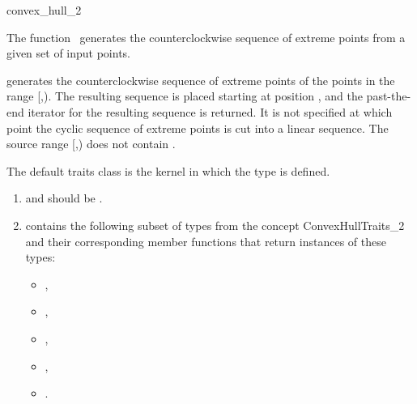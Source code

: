 

\begin{ccRefFunction}{convex_hull_2}  %

\ccDefinition
  
The function \ccRefName\ generates the counterclockwise sequence of extreme
points from a given set of input points.  


            {generates the counterclockwise sequence of extreme points
            of the points in the range [,).
            The resulting sequence is placed starting at position
            , and the past-the-end iterator for the resulting
            sequence is returned. It is not specified at which point the
            cyclic sequence of extreme points is cut into a linear sequence.
            \ccPrecond %
            The source range [,) does not contain
            .}

The default traits class  is the kernel in which
the type  is defined. 

\begin{enumerate}
   \item    {} and 
            should be .
   \item    {} contains the following subset of types from
            the concept ConvexHullTraits\_2 and their corresponding member
            functions that return instances of these types:
            \begin{itemize}
                \item {},
                \item {}, 
                \item {},
                \item {}, 
                \item {}.
            \end{itemize}
\end{enumerate}



\end{ccRefFunction}

